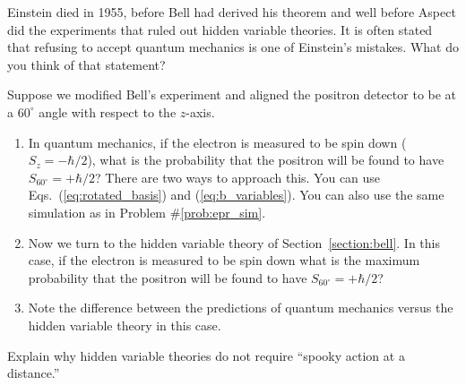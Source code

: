 \begin{problem}
  Einstein died in 1955, before Bell had derived his theorem and well
  before Aspect did the experiments that ruled out hidden variable
  theories.  It is often stated that refusing to accept quantum
  mechanics is one of Einstein's mistakes.  What do you think of that
  statement?
\end{problem}


\newpage 

\begin{problem}
Suppose we modified Bell's experiment and aligned the positron detector to be at a $60^\circ$ angle with respect to the $z$-axis.  
\begin{enumerate}
  \item In quantum mechanics, if the electron is measured to be spin
    down ($S_z=-\hbar/2$), what is the probability that the
    positron will be found to have $S_{60^\circ} =+\hbar/2$?  There are two ways to approach this.  You can use Eqs.~(\ref{eq:rotated_basis}) 
and (\ref{eq:b_variables}).  You can also use the same simulation as in Problem 
\#\ref{prob:epr_sim}.
  \item Now we turn to the hidden variable theory of
    Section~\ref{section:bell}.  In this case, if the electron is
    measured to be spin down what is the maximum probability that the
    positron will be found to have $S_{60^\circ}=+\hbar/2$?
  \item Note the difference between the predictions of quantum mechanics 
    versus the hidden variable theory in this case.
\end{enumerate}
\end{problem}



\begin{problem}
  Explain why hidden variable theories do not require ``spooky action 
at a distance.''
\end{problem}





